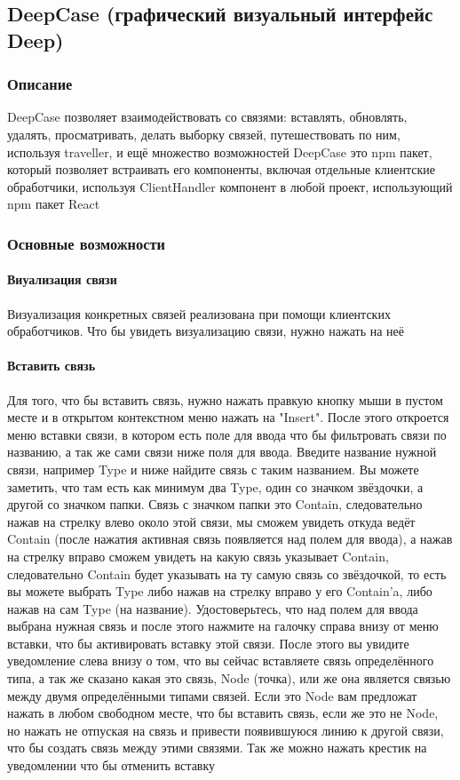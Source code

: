 \documentclass{article}
\begin{document}
\subsection{DeepCase (графический визуальный интерфейс Deep)}
\subsubsection{Описание}
DeepCase позволяет взаимодействовать со связями: вставлять,
                обновлять, удалять, просматривать, делать выборку связей, путешествовать по ним, используя traveller, и ещё множество возможностей
DeepCase это npm пакет, который позволяет встраивать его компоненты, включая отдельные клиентские обработчики, используя ClientHandler компонент в любой проект, использующий npm пакет React
\subsubsection{Основные возможности}
\paragraph{Виуализация связи}
Визуализация конкретных связей реализована при помощи клиентских обработчиков. Что бы увидеть визуализацию связи, нужно нажать на неё
\paragraph{Вставить связь}
Для того, что бы вставить связь, нужно нажать правкую кнопку мыши в пустом
месте и в открытом контекстном меню нажать на "Insert". После этого откроется
меню вставки связи, в котором есть поле для ввода что бы фильтровать связи по
названию, а так же сами связи ниже поля для ввода. Введите название нужной
связи, например Type и ниже найдите связь с таким названием. Вы можете
заметить, что там есть как минимум два Type, один со значком звёздочки, а
другой со значком папки. Связь с значком папки это Contain, следовательно нажав
на стрелку влево около этой связи, мы сможем увидеть откуда ведёт Contain
(после нажатия активная связь появляется над полем для ввода), а нажав на
стрелку вправо сможем увидеть на какую связь указывает Contain, следовательно
Contain будет указывать на ту самую связь со звёздочкой, то есть вы можете
выбрать Type либо нажав на стрелку вправо у его Contain'a, либо нажав на сам
Type (на название). Удостоверьтесь, что над полем для ввода выбрана нужная
связь и после этого нажмите на галочку справа внизу от меню вставки, что бы
активировать вставку этой связи. После этого вы увидите уведомление слева внизу
о том, что вы сейчас вставляете связь определённого типа, а так же сказано
какая это связь, Node (точка), или же она является связью между двумя
определёнными типами связей. Если это Node вам предложат нажать в любом
свободном месте, что бы вставить связь, если же это не Node, но нажать не
отпуская на связь и привести появившуюся линию к другой связи, что бы создать
связь между этими связями. Так же можно нажать крестик на уведомлении что бы
отменить вставку
\end{document}
